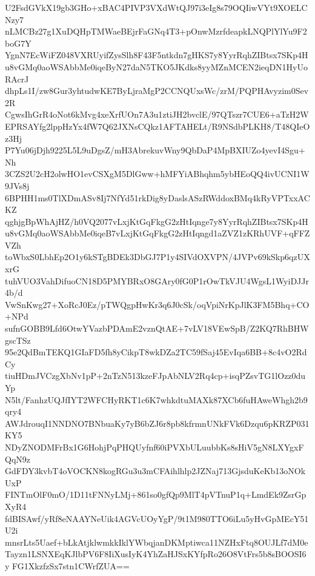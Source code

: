 U2FsdGVkX19gb3GHo+xBAC4PIVP3VXdWtQJ97i3eIg8s79OQIiwVYt9XOELCNzy7
nLMCBz27g1XuDQHpTMWaeBEjrFaGNq4T3+pOnwMzrfdeapkLNQPlYlYu9F2boG7Y
YgnN7EcWiFZ048VXRUyifZysSlh8F43F5ntkdn7gHKS7y8YyrRqhZIBtsx7SKp4H
u8vGMq0aoWSAbbMe0iqeByN27daN5TKO5JKdks8yyMZnMCEN2ieqDN1HyUoRAcrJ
dhpLs1I/zw8Gur3yhtudwKE7ByLjraMgP2CCNQUxsWc/zrM/PQPHAvyzim0Sev2R
CgwsIhGrR4oNot6kMvg4xeXrfUOn7A3u1ztiJH2bvclE/97QTszr7CUE6+aTzH2W
EPRSAYfg2lppHzYx4fW7Q62JXNsCQkz1AFTAHELt/R9NSdbPLKH8/T48QIeOz3Hj
P7Yu06jDjh9225L5L9uDgsZ/mH3AbrekuvWny9QbDaP4MpBXIUZo4yevI4Sgu+Nh
3CZS2U2cH2olwHO1evCSXgM5DlGww+hMFYiABhqhm5ybHEoQQ4ivUCNI1W9JVs8j
6BPHH1ms0TlXDmASv8Ij7NfYd51rkDig8yDaslsASzRWddoxBMq4kRyVPTxxACKZ
qghjgBpWhAjHZ/h0VQ2077vLxjKtGqFkgG2zHtIqnge7y8YyrRqhZIBtsx7SKp4H
u8vGMq0aoWSAbbMe0iqeB7vLxjKtGqFkgG2zHtIqngd1aZVZ1zKRhUVF+qFFZVZh
toWbxS0LbhEp2O1y6kSTgBDEk3DbGJ7P1y4SIVdOXVPN/4JVPv69kSkp6qzUXxrG
tuhVUO3VahDifuoCN18D5PMYBRxO8GAry0fG0P1rOwTkVJU4WgsL1WyiDJJr4b/d
VwSnKwg27+XoRcJ0Ez/pTWQgpHwKr3q6J0cSk/oqVpiNrKpJlK3FM5Bhq+CO+NPd
sufnGOBB9Lfd6OtwYVazbPDAmE2vznQtAE+7vLV18VEwSpB/Z2KQ7RhBHWgscTSz
95e2QdBmTEKQ1GIaFD5fh8yCikpT8wkDZa2TC59fSaj45EvIqa6BB+8c4vO2RdCy
tiuHDmJVCzgXbNv1pP+2nTzN513kzeFJpAbNLV2Rq4cp+isqPZsvTG1lOzz0duYp
N5lt/FanhzUQJfIYT2WFCHyRKT1c6K7whkdtuMAXk87XCb6fuHAweWhgh2b9qry4
AWJdrouqI1NNDNO7BNbuaKy7yB6bZJ6r8pb8kfrmnUNkFVk6Dzqu6pKRZP031KY5
NDyZNODMFrBx1G6HohjPqPHQUyfnf60iPVXbULuubbKs8sHiV5gN8LXYgxFQqN9z
GdFDY3kvbT4oVOCKN8kogRGu3u3mCFAihlhlp2JZNaj713GjsduKeKb13oNOkUxP
FINTmOlF0mO/1D11tFNNyLMj+861so0gfQp9MlT4pVTnuP1q+LmdEk9ZsrGpXyR4
fdBISAwf/yRf8eNAAYNeUik4AGVcUOyYgP/9t1M980TTO6iLu5yHvGpMEcY51U2i
mnsrLts5Uaef+bLkAtjklwmkkIklYWbqjanDKMptiwca11NZHxFtq8OUJLf7dM0e
Tayzn1LSNXEqKJlbPV6F8IiXusIyK4YhZaHJSxKYfpRo26O8VtFrs5b8sBOOSI6y
FG1XkzfzSx7stn1CWrfZUA==
